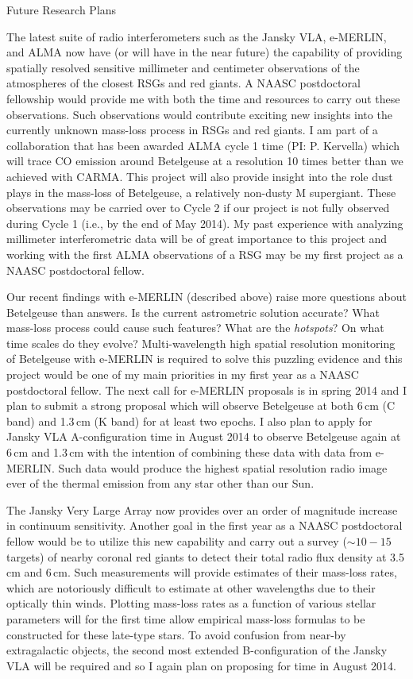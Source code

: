 \documentclass[11pt]{letter} %
\begin{document}
{\Large 
\begin{center}
Future Research Plans
\end{center}
}
The latest suite of radio interferometers such as the Jansky VLA, e-MERLIN, and ALMA now have (or will have in the near future) the capability of providing spatially resolved sensitive millimeter and centimeter observations of the atmospheres of the closest RSGs and red giants. A NAASC postdoctoral fellowship would provide me with both the time and resources to carry out these observations. Such observations would contribute exciting new insights into the currently unknown mass-loss process in RSGs and red giants. I am part of a collaboration that has been awarded ALMA cycle 1 time (PI: P. Kervella) which will trace CO emission around Betelgeuse at a resolution 10 times better than we achieved with CARMA. This project will also provide insight into the role dust plays in the mass-loss of Betelgeuse, a relatively non-dusty M supergiant. These observations may be carried over to Cycle 2 if our project is not fully observed during Cycle 1 (i.e., by the end of May 2014). My past experience with analyzing millimeter interferometric data will be of great importance to this project and working with the first ALMA observations of a RSG may be my first project as a NAASC postdoctoral fellow. 

Our recent findings with e-MERLIN (described above) raise more questions about Betelgeuse than answers. Is the current astrometric solution accurate? What mass-loss process could cause such features? What are the \textit{hotspots}? On what time scales do they evolve? Multi-wavelength high spatial resolution monitoring of Betelgeuse with e-MERLIN is required to solve this puzzling evidence and this project would be one of my main priorities in my first year as a NAASC postdoctoral fellow. The next call for e-MERLIN proposals is in spring 2014 and I plan to submit a strong proposal which will observe Betelgeuse at both 6\,cm (C band) and 1.3\,cm (K band) for at least two epochs. I also plan to apply for Jansky VLA A-configuration time in August 2014 to observe Betelgeuse again at 6\,cm and 1.3\,cm with the intention of combining these data with data from e-MERLIN. Such data would produce the highest spatial resolution radio image ever of the thermal emission from any star other than our Sun.

The Jansky Very Large Array now provides over an order of magnitude increase in continuum sensitivity. Another goal in the first year as a NAASC postdoctoral fellow would be to utilize this new capability and carry out a survey ($\sim 10 - 15$ targets) of nearby coronal red giants to detect their total radio flux density at 3.5\,cm and 6\,cm. Such measurements will provide estimates of their mass-loss rates, which are notoriously difficult to estimate at other wavelengths due to their optically thin winds. Plotting mass-loss rates as a function of various stellar parameters will for the first time allow empirical mass-loss formulas to be constructed for these late-type stars. To avoid confusion from near-by extragalactic objects, the second most extended B-configuration of the Jansky VLA will be required and so I again plan on proposing for time in August 2014.
\end{document}
